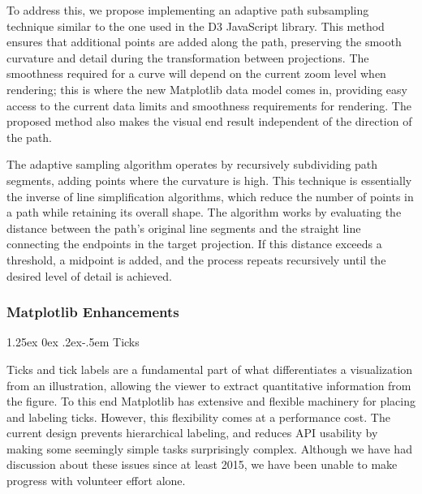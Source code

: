 \documentclass[12pt]{article}
\makeatletter
\numberwithin{page}{section}
\renewcommand{\paragraph}{%
  \@startsection{paragraph}{4}%
  {\z@}{1.25ex \@plus 0ex \@minus .2ex}{-.5em}%
  {\normalfont\normalsize\itshape\bfseries}%
}
\makeatother
\begin{document}
To address this, we propose implementing an adaptive path subsampling technique similar to
the one used in the D3 JavaScript library. This method ensures that additional points are
added along the path, preserving the smooth curvature and detail during the
transformation between projections. The smoothness required for a curve will depend on the current
zoom level when rendering; this is where the new Matplotlib data model comes
in, providing easy
access to the current data limits and smoothness requirements for rendering.
The proposed method also makes the visual end result independent
of the direction of the path.


The adaptive sampling algorithm operates by recursively subdividing path segments,
adding points where the curvature is high.
This technique is essentially the inverse of line simplification algorithms,
which reduce the number of points in a path while retaining its overall shape.
The algorithm works by evaluating
the distance between the path's original line segments and the straight line
connecting the endpoints in the target projection. If this distance exceeds a
threshold, a midpoint is added, and the process repeats recursively until
the desired level of detail is achieved.


\subsubsection{Matplotlib Enhancements}

\paragraph{Ticks}

Ticks and tick labels are a fundamental part of what differentiates a
visualization from an illustration, allowing the viewer to extract quantitative
information from the figure.  To this end Matplotlib has extensive and flexible
machinery for placing and labeling ticks.  However, this flexibility comes at a
performance cost. The current design prevents hierarchical
labeling, and reduces API usability by making some seemingly simple tasks
surprisingly complex. Although we have had discussion about these issues since
at least 2015, we have been unable to make progress with
volunteer effort alone.
\end{document}
